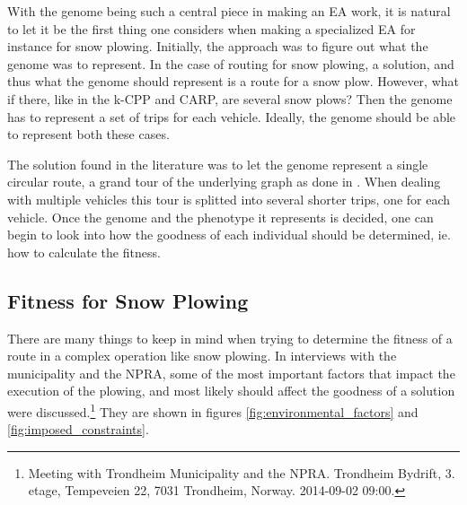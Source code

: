 With the genome being such a central piece in making an EA work, it is natural to let it be the first thing one considers when making a specialized EA for instance for snow plowing. Initially, the approach was to figure out what the genome was to represent. In the case of routing for snow plowing, a solution, and thus what the genome should represent is a route for a snow plow. However, what if there, like in the k-CPP and CARP, are several snow plows? Then the genome has to represent a set of trips for each vehicle. Ideally, the genome should be able to represent both these cases.

The solution found in the literature was to let the genome represent a single circular route, a grand tour of the underlying graph as done in \citet{lacomme2001GA}. When dealing with multiple vehicles this tour is splitted into several shorter trips, one for each vehicle. Once the genome and the phenotype it represents is decided, one can begin to look into how the goodness of each individual should be determined, ie. how to calculate the fitness.

\subsection{Fitness for Snow Plowing} %
\label{sub:fitness_for_snow_plowing}

There are many things to keep in mind when trying to determine the fitness of a route in a complex operation like snow plowing. In interviews with the municipality and the NPRA, some of the most important factors that impact the execution of the plowing, and most likely should affect the goodness of a solution were discussed.\footnote{Meeting with Trondheim Municipality and the NPRA. Trondheim Bydrift, 3. etage, Tempeveien 22, 7031 Trondheim, Norway. 2014-09-02 09:00.} They are shown in figures \ref{fig:environmental_factors} and \ref{fig:imposed_constraints}.


